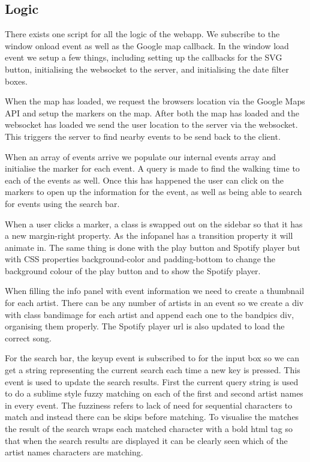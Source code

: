 \documentclass[10pt]{article}
\begin{document}
        \subsection{Logic}
            There exists one script for all the logic of the webapp. We subscribe to the window onload event as well as the Google map callback. In the window load event we setup a few things, including setting up the callbacks for the SVG button, initialising the websocket to the server, and initialising the date filter boxes.

            When the map has loaded, we request the browsers location via the Google Maps API and setup the markers on the map. After both the map has loaded and the websocket has loaded we send the user location to the server via the websocket. This triggers the server to find nearby events to be send back to the client.

            When an array of events arrive we populate our internal events array and initialise the marker for each event. A query is made to find the walking time to each of the events as well. Once this has happened the user can click on the markers to open up the information for the event, as well as being able to search for events using the search bar.

            When a user clicks a marker, a class is swapped out on the sidebar so that it has a new margin-right property. As the infopanel has a transition property it will animate in. The same thing is done with the play button and Spotify player but with CSS properties background-color and padding-bottom to change the background colour of the play button and to show the Spotify player.

            When filling the info panel with event information we need to create a thumbnail for each artist. There can be any number of artists in an event so we create a div with class bandimage for each artist and append each one to the bandpics div, organising them properly. The Spotify player url is also updated to load the correct song.

            For the search bar, the keyup event is subscribed to for the input box so we can get a string representing the current search each time a new key is pressed. This event is used to update the search results. First the current query string is used to do a sublime style fuzzy matching on each of the first and second artist names in every event. The fuzziness refers to lack of need for sequential characters to match and instead there can be skips before matching. To visualise the matches the result of the search wraps each matched character with a bold html tag so that when the search results are displayed it can be clearly seen which of the artist names characters are matching.
\end{document}
